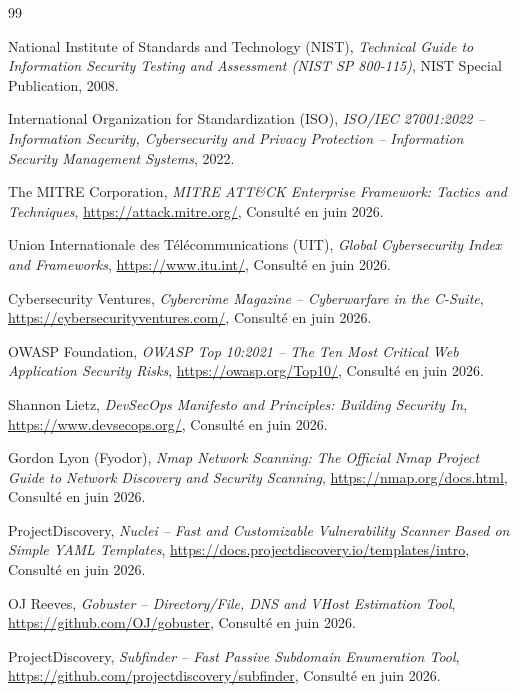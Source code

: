 \renewcommand{\bibname}{Bibliographie et Webographie}
\begin{thebibliography}{99}

     National Institute of Standards and Technology (NIST), \textit{Technical Guide to Information Security Testing and Assessment (NIST SP 800-115)}, NIST Special Publication, 2008.

     International Organization for Standardization (ISO), \textit{ISO/IEC 27001:2022 -- Information Security, Cybersecurity and Privacy Protection -- Information Security Management Systems}, 2022.

     The MITRE Corporation, \textit{MITRE ATT\&CK Enterprise Framework: Tactics and Techniques}, \url{https://attack.mitre.org/}, Consult\'e en juin 2026.

     Union Internationale des T\'el\'ecommunications (UIT), \textit{Global Cybersecurity Index and Frameworks}, \url{https://www.itu.int/}, Consult\'e en juin 2026.

     Cybersecurity Ventures, \textit{Cybercrime Magazine -- Cyberwarfare in the C-Suite}, \url{https://cybersecurityventures.com/}, Consult\'e en juin 2026.

     OWASP Foundation, \textit{OWASP Top 10:2021 -- The Ten Most Critical Web Application Security Risks}, \url{https://owasp.org/Top10/}, Consult\'e en juin 2026.

     Shannon Lietz, \textit{DevSecOps Manifesto and Principles: Building Security In}, \url{https://www.devsecops.org/}, Consult\'e en juin 2026.

     Gordon Lyon (Fyodor), \textit{Nmap Network Scanning: The Official Nmap Project Guide to Network Discovery and Security Scanning}, \url{https://nmap.org/docs.html}, Consult\'e en juin 2026.

     ProjectDiscovery, \textit{Nuclei -- Fast and Customizable Vulnerability Scanner Based on Simple YAML Templates}, \url{https://docs.projectdiscovery.io/templates/intro}, Consult\'e en juin 2026.

     OJ Reeves, \textit{Gobuster -- Directory/File, DNS and VHost Estimation Tool}, \url{https://github.com/OJ/gobuster}, Consult\'e en juin 2026.

     ProjectDiscovery, \textit{Subfinder -- Fast Passive Subdomain Enumeration Tool}, \url{https://github.com/projectdiscovery/subfinder}, Consult\'e en juin 2026.


\end{thebibliography}
